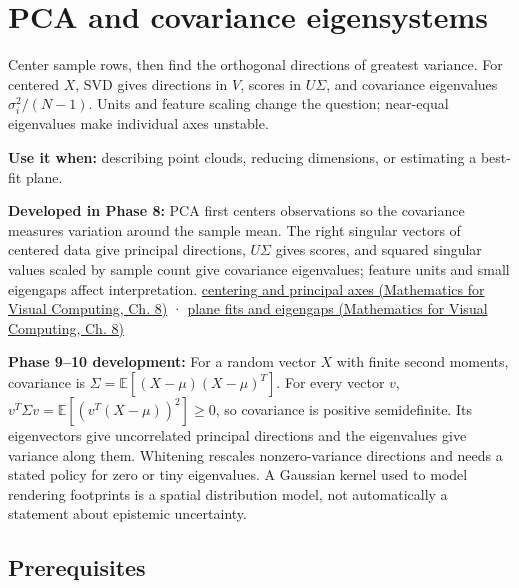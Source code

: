 \hypertarget{appendix-ad175ef3c5bf}{}\label{referencestart:appendix-ad175ef3c5bf}
\section{PCA and covariance eigensystems}\label{appendix-ad175ef3c5bf-pca-and-covariance-eigensystems}

\hypertarget{appendix-ad175ef3c5bf-pca-and-covariance-eigensystems}{}

Center sample rows, then find the orthogonal directions of greatest variance. For centered \(X\), SVD gives directions in \(V\), scores in \(U\Sigma\), and covariance eigenvalues \(\sigma_i^2/(N-1)\). Units and feature scaling change the question; near-equal eigenvalues make individual axes unstable.

\textbf{Use it when:} describing point clouds, reducing dimensions, or estimating a best-fit plane.

\textbf{Developed in Phase 8:} PCA first centers observations so the covariance measures variation around the sample mean. The right singular vectors of centered data give principal directions, \(U\Sigma\) gives scores, and squared singular values scaled by sample count give covariance eigenvalues; feature units and small eigengaps affect interpretation. \href{../02-Mathematics-for-Visual-Computing/main.pdf\#nameddest=02-foundations-ii-ch024-centered-measurements-reveal-principal-directions}{centering and principal axes (Mathematics for Visual Computing, Ch. 8)} · \href{../02-Mathematics-for-Visual-Computing/main.pdf\#nameddest=02-foundations-ii-ch024-plane-fits-eigengaps-and-interpretation-of-uncertain-components}{plane fits and eigengaps (Mathematics for Visual Computing, Ch. 8)}

\textbf{Phase 9--10 development:} For a random vector \(X\) with finite second moments, covariance is \(\Sigma=\mathbb E[(X-\mu)(X-\mu)^T]\). For every vector \(v\), \(v^T\Sigma v=\mathbb E[(v^T(X-\mu))^2]\geq0\), so covariance is positive semidefinite. Its eigenvectors give uncorrelated principal directions and the eigenvalues give variance along them. Whitening rescales nonzero-variance directions and needs a stated policy for zero or tiny eigenvalues. A Gaussian kernel used to model rendering footprints is a spatial distribution model, not automatically a statement about epistemic uncertainty.

\subsection{Prerequisites}\label{appendix-ad175ef3c5bf-prerequisites}

